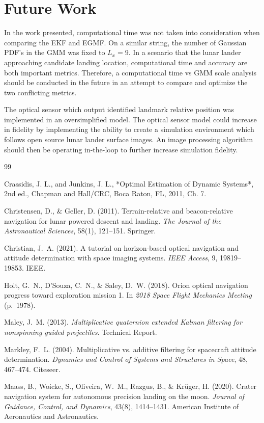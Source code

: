 \documentclass[conf]{new-aiaa}
\begin{document}
\section{Future Work}
In the work presented, computational time was not taken into consideration when comparing the EKF and EGMF. On a similar string, the number of Gaussian PDF's in the GMM was fixed to $L_x = 9$. In a scenario that the lunar lander approaching candidate landing location, computational time and accuracy are both important metrics. Therefore, a computational time vs GMM scale analysis should be conducted in the future in an attempt to compare and optimize the two conflicting metrics.

The optical sensor which output identified landmark relative position was implemented in an oversimplified model. The optical sensor model could increase in fidelity by implementing the ability to create a simulation environment which follows open source lunar lander surface images. An image processing algorithm should then be operating in-the-loop to further increase simulation fidelity. 


\begin{thebibliography}{99}

Crassidis, J. L., and Junkins, J. L., *Optimal Estimation of Dynamic Systems*, 2nd ed., Chapman and Hall/CRC, Boca Raton, FL, 2011, Ch. 7.


Christensen, D., \& Geller, D. (2011).
Terrain-relative and beacon-relative navigation for lunar powered descent and landing.
\textit{The Journal of the Astronautical Sciences}, 58(1), 121--151. Springer.


Christian, J.~A. (2021).
A tutorial on horizon-based optical navigation and attitude determination with space imaging systems.
\textit{IEEE Access}, 9, 19819--19853. IEEE.

Holt, G.~N., D'Souza, C.~N., \& Saley, D.~W. (2018).
Orion optical navigation progress toward exploration mission 1.
In \textit{2018 Space Flight Mechanics Meeting} (p.~1978).


Maley, J.~M. (2013).
\textit{Multiplicative quaternion extended Kalman filtering for nonspinning guided projectiles}.
Technical Report.

Markley, F.~L. (2004).
Multiplicative vs. additive filtering for spacecraft attitude determination.
\textit{Dynamics and Control of Systems and Structures in Space}, 48, 467--474. Citeseer.

Maass, B., Woicke, S., Oliveira, W.~M., Razgus, B., \& Kr{\"u}ger, H. (2020).
Crater navigation system for autonomous precision landing on the moon.
\textit{Journal of Guidance, Control, and Dynamics}, 43(8), 1414--1431. American Institute of Aeronautics and Astronautics.

\end{thebibliography}
\end{document}
